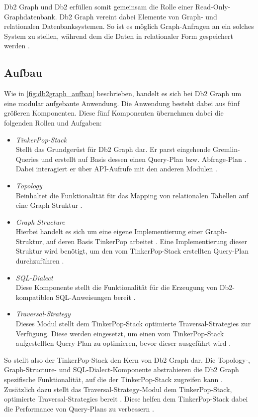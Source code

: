 Db2 Graph und Db2 erfüllen somit gemeinsam die Rolle einer Read-Only-Graphdatenbank. Db2 Graph vereint dabei Elemente von Graph- und relationalen Datenbanksystemen. So ist es möglich Graph-Anfragen an ein solches System zu stellen, während dem die Daten in relationaler Form gespeichert werden \cite{vldb_tian, sigmod_tian}. 

\subsection{Aufbau}
Wie in \autoref{fig:db2graph_aufbau} beschrieben, handelt es sich bei Db2 Graph um eine modular aufgebaute Anwendung. Die Anwendung besteht dabei aus fünf größeren Komponenten. Diese fünf Komponenten übernehmen dabei die folgenden Rollen und Aufgaben: 

\begin{itemize}
    \item \textit{TinkerPop-Stack}\\Stellt das Grundgerüst für Db2 Graph dar. Er parst eingehende Gremlin-Queries und erstellt auf Basis dessen einen Query-Plan bzw. Abfrage-Plan \cite{vldb_tian}. Dabei interagiert er über API-Aufrufe mit den anderen Modulen \cite{vldb_tian}.
    \item \textit{Topology}\\Beinhaltet die Funktionalität für das Mapping von relationalen Tabellen auf eine Graph-Struktur \cite{vldb_tian, sigmod_tian}.
    \item \textit{Graph Structure}\\Hierbei handelt es sich um eine eigene Implementierung einer Graph-Struktur, auf deren Basis TinkerPop arbeitet \cite{vldb_tian}. Eine Implementierung dieser Struktur wird benötigt, um den vom TinkerPop-Stack erstellten Query-Plan durchzuführen \cite{sigmod_tian}. 
    \item \textit{SQL-Dialect}\\Diese Komponente stellt die Funktionalität für die Erzeugung von Db2-kompatiblen SQL-Anweisungen bereit \cite{sigmod_tian}.
    \item \textit{Traversal-Strategy}\\Dieses Modul stellt dem TinkerPop-Stack optimierte Traversal-Strategies zur Verfügung. Diese werden eingesetzt, um einen vom TinkerPop-Stack aufgestellten Query-Plan zu optimieren, bevor dieser ausgeführt wird \cite{sigmod_tian}.  
\end{itemize}

So stellt also der TinkerPop-Stack den Kern von Db2 Graph dar. Die Topology-, Graph-Structure- und SQL-Dialect-Komponente abstrahieren die Db2 Graph spezifische Funktionalität, auf die der TinkerPop-Stack zugreifen kann \cite{sigmod_tian}. Zusätzlich dazu stellt das Traversal-Strategy-Modul dem TinkerPop-Stack, optimierte Traversal-Strategies bereit \cite{sigmod_tian}. Diese helfen dem TinkerPop-Stack dabei die Performance von Query-Plans zu verbessern \cite{sigmod_tian}.  

